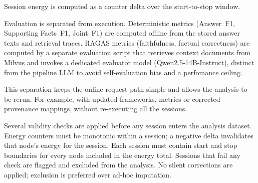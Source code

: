 Session energy is computed as a counter delta over the start-to-stop window.


Evaluation is separated from execution. Deterministic metrics (Answer~F1,
Supporting Facts~F1, Joint~F1) are computed offline from the stored answer
texts and retrieval traces. RAGAS metrics (faithfulness, factual correctness)
are computed by a separate evaluation script that retrieves context documents
from Milvus and invokes a dedicated evaluator model (Qwen2.5-14B-Instruct),
distinct from the pipeline LLM to avoid self-evaluation bias and a perfomance ceiling. 

This separation keeps the online request path simple and allows the analysis to
be rerun. For example, with updated frameworks, metrics or corrected provenance
mappings, without re-executing all the sessions.





Several validity checks are applied before any session enters the analysis
dataset. Energy counters must be monotonic within a session; a negative delta
invalidates that node's energy for the session. Each session must contain
start and stop boundaries for every node included in the energy total. Sessions
that fail any check are flagged and excluded from the analysis. No silent
corrections are applied; exclusion is preferred over ad-hoc imputation.

